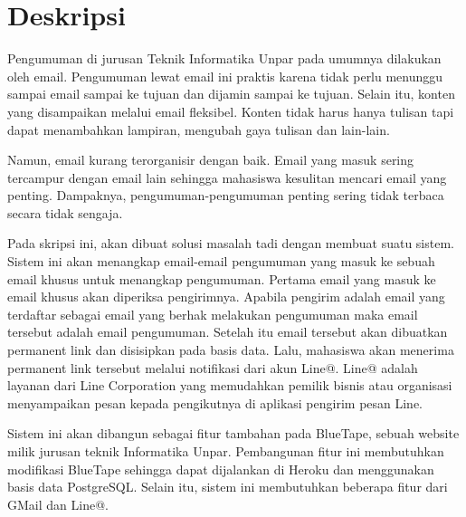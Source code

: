 \documentclass[a4paper,twoside]{article}
\begin{document}
\title{\@judultopik}
\author{\nama \textendash \@npm} 

\newcommand{\nama}{Ellena Angelica}
\newcommand{\@npm}{2015730029}
\newcommand{\@judultopik}{Kolektor Pengumuman Informatika} %
\newcommand{\jumpemb}{1} %
\newcommand{\tanggal}{08/08/2018}
\maketitle


\section{Deskripsi}
Pengumuman di jurusan Teknik Informatika Unpar pada umumnya dilakukan oleh email. Pengumuman lewat email ini praktis karena tidak perlu menunggu sampai email sampai ke tujuan dan dijamin sampai ke tujuan. Selain itu, konten yang disampaikan melalui email fleksibel. Konten tidak harus hanya tulisan tapi dapat menambahkan lampiran, mengubah gaya tulisan dan lain-lain.

Namun, email kurang terorganisir dengan baik. Email yang masuk sering tercampur dengan email lain sehingga mahasiswa kesulitan mencari email yang penting. Dampaknya, pengumuman-pengumuman penting sering tidak terbaca secara tidak sengaja.

Pada skripsi ini, akan dibuat solusi masalah tadi dengan membuat suatu sistem. Sistem ini akan menangkap email-email pengumuman yang masuk ke sebuah email khusus untuk menangkap pengumuman. Pertama email yang masuk ke email khusus akan diperiksa pengirimnya. Apabila pengirim adalah email yang terdaftar sebagai email yang berhak melakukan pengumuman maka email tersebut adalah email pengumuman. Setelah itu email tersebut akan dibuatkan permanent link dan disisipkan pada basis data. Lalu, mahasiswa akan menerima permanent link tersebut melalui notifikasi dari akun Line@. Line@ adalah layanan dari Line Corporation yang memudahkan pemilik bisnis atau organisasi menyampaikan pesan kepada pengikutnya di aplikasi pengirim pesan Line.

Sistem ini akan dibangun sebagai fitur tambahan pada BlueTape, sebuah website milik jurusan teknik Informatika Unpar. Pembangunan fitur ini membutuhkan modifikasi BlueTape sehingga dapat dijalankan di Heroku dan menggunakan basis data PostgreSQL. Selain itu, sistem ini membutuhkan beberapa fitur dari GMail dan Line@.
\end{document}
